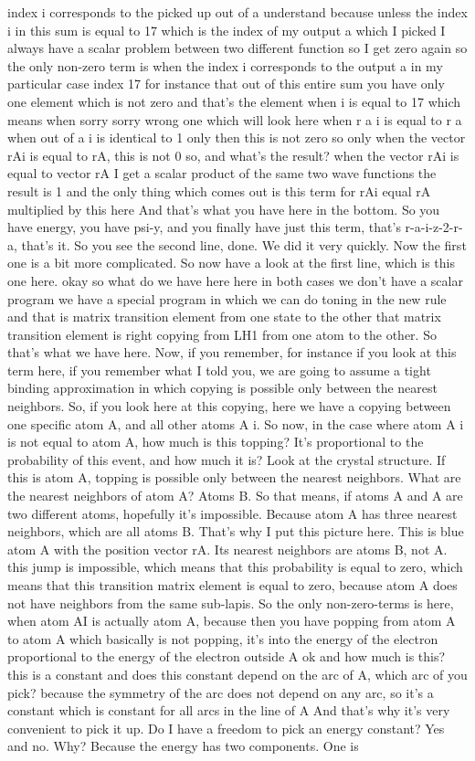 index i corresponds to the picked up out of a understand because unless the index i in this sum is equal to 17 which is the index of my output a which I picked I always have a scalar problem between two different function so I get zero again so the only non-zero term is when the index i corresponds to the output a in my particular case index 17 for instance that out of this entire sum you have only one element which is not zero and that's the element when i is equal to 17 which means when sorry sorry wrong one which will look here when r a i is equal to r a when out of a i is identical to 1 only then this is not zero so only when the vector rAi is equal to rA, this is not 0 so, and what's the result? when the vector rAi is equal to vector rA I get a scalar product of the same two wave functions the result is 1 and the only thing which comes out is this term for rAi equal rA multiplied by this here And that's what you have here in the bottom. So you have energy, you have psi-y, and you finally have just this term, that's r-a-i-z-2-r-a, that's it. So you see the second line, done. We did it very quickly. Now the first one is a bit more complicated. So now have a look at the first line, which is this one here. okay so what do we have here here in both cases we don't have a scalar program we have a special program in which we can do toning in the new rule and that is matrix transition element from one state to the other that matrix transition element is right copying from LH1 from one atom to the other. So that's what we have here. Now, if you remember, for instance if you look at this term here, if you remember what I told you, we are going to assume a tight binding approximation in which copying is possible only between the nearest neighbors. So, if you look here at this copying, here we have a copying between one specific atom A, and all other atoms A i. So now, in the case where atom A i is not equal to atom A, how much is this topping? It's proportional to the probability of this event, and how much it is? Look at the crystal structure. If this is atom A, topping is possible only between the nearest neighbors. What are the nearest neighbors of atom A? Atoms B. So that means, if atoms A and A are two different atoms, hopefully it's impossible. Because atom A has three nearest neighbors, which are all atoms B. That's why I put this picture here. This is blue atom A with the position vector rA. Its nearest neighbors are atoms B, not A. this jump is impossible, which means that this probability is equal to zero, which means that this transition matrix element is equal to zero, because atom A does not have neighbors from the same sub-lapis. So the only non-zero-terms is here, when atom AI is actually atom A, because then you have popping from atom A to atom A which basically is not popping, it's into the energy of the electron proportional to the energy of the electron outside A ok and how much is this? this is a constant and does this constant depend on the arc of A, which arc of you pick? because the symmetry of the arc does not depend on any arc, so it's a constant which is constant for all arcs in the line of A And that's why it's very convenient to pick it up. Do I have a freedom to pick an energy constant? Yes and no. Why? Because the energy has two components. One is 